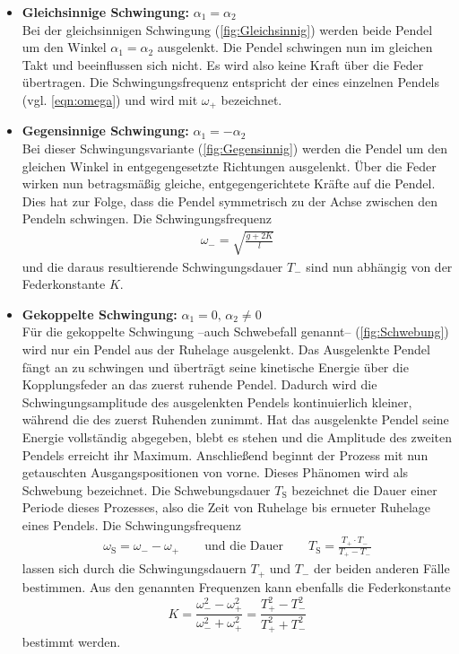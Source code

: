 \begin{itemize}
    \item \textbf{Gleichsinnige Schwingung:} $\alpha_1 = \alpha_2$ \\
    Bei der gleichsinnigen Schwingung (\autoref{fig:Gleichsinnig}) werden beide Pendel um den Winkel $\alpha_1 = \alpha_2$ ausgelenkt. Die Pendel schwingen nun im gleichen Takt und beeinflussen sich nicht.
    Es wird also keine Kraft über die Feder übertragen. Die Schwingungsfrequenz entspricht der eines einzelnen Pendels (vgl. \autoref{eqn:omega}) und wird mit $\omega_+$ bezeichnet.

    \item \textbf{Gegensinnige Schwingung:} $\alpha_1 = -\alpha_2$ \\
    Bei dieser Schwingungsvariante (\autoref{fig:Gegensinnig}) werden die Pendel um den gleichen Winkel in entgegengesetzte Richtungen ausgelenkt. Über die Feder wirken nun betragsmäßig gleiche,
    entgegengerichtete Kräfte auf die Pendel. Dies hat zur Folge, dass die Pendel symmetrisch zu der Achse zwischen den Pendeln schwingen. Die Schwingungsfrequenz 
    \begin{gather}
        \label{eqn:omega_Gegensinnig}
        \omega_- = \sqrt{\frac{g + 2K}{l}}
    \end{gather}
    und die daraus resultierende Schwingungsdauer $T_-$ sind nun abhängig von der Federkonstante $K$. 
    
    \item \textbf{Gekoppelte Schwingung:} $\alpha_1 = 0, \, \alpha_2 \neq 0$ \\
    Für die gekoppelte Schwingung --auch Schwebefall genannt-- (\autoref{fig:Schwebung}) wird nur ein Pendel aus der Ruhelage ausgelenkt. Das Ausgelenkte Pendel fängt an zu schwingen und überträgt seine 
    kinetische Energie über die Kopplungsfeder an das zuerst ruhende Pendel. Dadurch wird die Schwingungsamplitude des ausgelenkten Pendels kontinuierlich kleiner, während
    die des zuerst Ruhenden zunimmt. Hat das ausgelenkte Pendel seine Energie vollständig abgegeben, blebt es stehen und die Amplitude des zweiten Pendels erreicht ihr Maximum.
    Anschließend beginnt der Prozess mit nun getauschten Ausgangspositionen von vorne. Dieses Phänomen wird als Schwebung bezeichnet. Die Schwebungsdauer $T_{\text{S}}$ bezeichnet 
    die Dauer einer Periode dieses Prozesses, also die Zeit von Ruhelage bis ernueter Ruhelage eines Pendels. Die Schwingungsfrequenz
    \begin{gather}
        \label{eqn:Schwebung}
        \omega_{\text{S}} = \omega_- - \omega_+ \qquad \text{und die Dauer} \qquad T_{\text{S}}  = \frac{T_+ \cdot T_-}{T_+ - T_-}
    \end{gather}
    lassen sich durch die Schwingungsdauern $T_+$ und $T_-$ der beiden anderen Fälle bestimmen.
    Aus den genannten Frequenzen kann ebenfalls die Federkonstante
    \begin{equation}
        \label{eqn:Federkonstante}
        K = \frac{\omega_-^2 - \omega_+^2}{\omega_-^2 + \omega_+^2} = \frac{T_+^2 - T_-^2}{T_+^2 + T_-^2}
    \end{equation}
    bestimmt werden.
\end{itemize}

